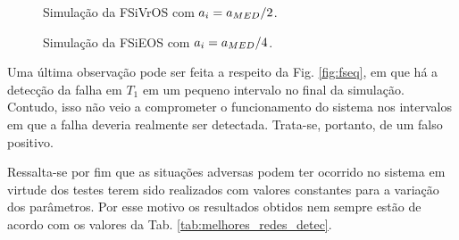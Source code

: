 \begin{figure}[htb]
\footnotesize
\centering

\vspace{1cm}
\caption{Simulação da FSiVrOS com $a_i = a_{\tiny MED}/2$.}
\label{fig:fsivros}
\end{figure}

\begin{figure}[htb]
\footnotesize
\centering

\vspace{1cm}
\caption{Simulação da FSiEOS com $a_i = a_{\tiny MED}/4$.}
\label{fig:fsieos}
\end{figure}

Uma última observação pode ser feita a respeito da Fig. \ref{fig:fseq}, em que
há a detecção da falha em $T_1$ em um pequeno intervalo no final da simulação.
Contudo, isso não veio a comprometer o funcionamento do sistema nos intervalos
em que a falha deveria realmente ser detectada. Trata-se, portanto, de um falso
positivo.

Ressalta-se por fim que as situações adversas podem ter ocorrido no sistema em
virtude dos testes terem sido realizados com valores constantes para a variação
dos parâmetros. Por esse motivo os resultados obtidos nem sempre estão de acordo
com os valores da Tab. \ref{tab:melhores_redes_detec}.
